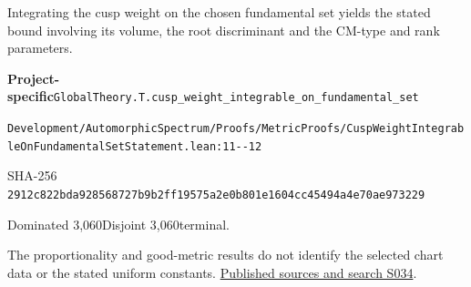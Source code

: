 
\begin{formalstatement}[D331]\label{decomp:D331}
Integrating the cusp weight on the chosen fundamental set yields the stated bound involving its volume, the root discriminant and the CM-type and rank parameters.
\end{formalstatement}
{\small\raggedright\noindent\textsf{\bfseries Project-specific}\quad \nolinkurl{GlobalTheory.T.cusp_weight_integrable_on_fundamental_set}\par\noindent \nolinkurl{Development/AutomorphicSpectrum/Proofs/MetricProofs/CuspWeightIntegrableOnFundamentalSetStatement.lean:11--12}\par\noindent SHA-256 \nolinkurl{2912c822bda928568727b9b2ff19575a2e0b801e1604cc45494a4e70ae973229}\par\noindent Dominated 3,060\quad Disjoint 3,060\quad terminal.\par}
The proportionality and good-metric results do not identify the selected chart data or the stated uniform constants.
\hyperref[lit:S034]{Published sources and search S034}.
